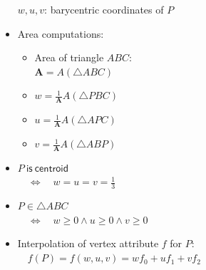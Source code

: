 \documentclass[utf8,stillsansserifmath,fleqn,t]{beamer}
\begin{document}
\begin{frame}
\begin{itemize}
    $w,u,v$: barycentric coordinates of $P$
\item Area computations:
    \begin{itemize}
    \item Area of triangle $A B C$:\\ $\mathbf{A} = A(\triangle A B C)$
    \item $w = \frac{1}{\mathbf{A}}A(\triangle P B C)$
    \item $u = \frac{1}{\mathbf{A}}A(\triangle A P C)$
    \item $v = \frac{1}{\mathbf{A}}A(\triangle A B P)$
    \end{itemize}
\item $P \mathsf{~is~centroid}$\\$\quad \Leftrightarrow \quad w = u = v = \frac{1}{3}$
\item $P \in \triangle A B C$\\$\quad \Leftrightarrow \quad w \geq 0 \wedge u \geq 0 \wedge v \geq 0$
\item Interpolation of vertex attribute $f$ for $P$:\\
    $\quad f(P) = f(w,u,v) = w f_0 + u f_1 + v f_2$
\end{itemize}
\end{frame}
\end{document}
